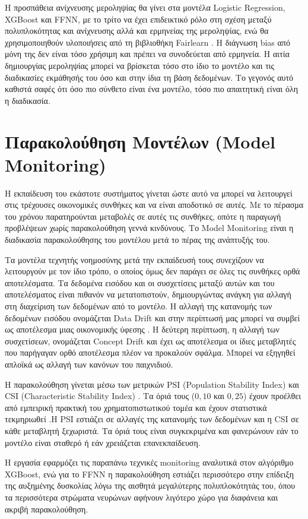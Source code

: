 Η προσπάθεια ανίχνευσης μεροληψίας θα γίνει στα μοντέλα Logistic
Regression, XGBoost και FFNN, με το τρίτο να έχει επιδεικτικό ρόλο
στη σχέση μεταξύ πολυπλοκότητας και ανίχνευσης αλλά και ερμηνείας
της μεροληψίας, ενώ θα χρησιμοποιηθούν υλοποιήσεις από τη βιβλιοθήκη
Fairlearn \citep{bird2020fairlearn}. Η διάγνωση bias από μόνη της δεν
είναι τόσο χρήσιμη και πρέπει να συνοδεύεται από ερμηνεία. Η αιτία
δημιουργίας μεροληψίας μπορεί να βρίσκεται τόσο στο ίδιο το μοντέλο
και τις διαδικασίες εκμάθησής του όσο και στην ίδια τη βάση δεδομένων.
Το γεγονός αυτό καθιστά σαφές ότι όσο πιο σύνθετο είναι ένα μοντέλο,
τόσο πιο απαιτητική είναι όλη η διαδικασία.
\section{Παρακολούθηση Μοντέλων (Model Monitoring)}
\label{sec:monitoring}

Η εκπαίδευση του εκάστοτε συστήματος γίνεται ώστε αυτό να μπορεί να
λειτουργεί στις τρέχουσες οικονομικές συνθήκες και να είναι αποδοτικό
σε αυτές. Με το πέρασμα του χρόνου παρατηρούνται μεταβολές σε αυτές
τις συνθήκες, οπότε η παραγωγή προβλέψεων χωρίς παρακολούθηση γεννά
κινδύνους. Το Model Monitoring είναι η διαδικασία παρακολούθησης του
μοντέλου μετά το πέρας της ανάπτυξής του.

Τα μοντέλα τεχνητής νοημοσύνης μετά την εκπαίδευσή τους συνεχίζουν
να λειτουργούν με τον ίδιο τρόπο, ο οποίος όμως δεν παράγει σε όλες
τις συνθήκες ορθά αποτελέσματα. Τα δεδομένα εισόδου και οι
συσχετίσεις μεταξύ αυτών και του αποτελέσματος είναι πιθανόν να
μετατοπιστούν, δημιουργώντας ανάγκη για αλλαγή στη διαχείριση των
δεδομένων από το μοντέλο. Η αλλαγή της κατανομής των δεδομένων
εισόδου ονομάζεται Data Drift και στην περίπτωσή μας μπορεί να συμβεί
ως αποτέλεσμα μιας οικονομικής ύφεσης \citep{widmer1996learning}. Η
δεύτερη περίπτωση, η αλλαγή των συσχετίσεων, ονομάζεται Concept Drift
και έχει ως αποτέλεσμα οι ίδιες μεταβλητές που παρήγαγαν ορθό
αποτέλεσμα πλέον να προκαλούν σφάλμα. Μπορεί να εξηγηθεί απλοϊκά ως
αλλαγή των κανόνων του παιχνιδιού.

Η παρακολούθηση γίνεται μέσω των μετρικών PSI (Population Stability
Index) και CSI (Characteristic Stability Index) \citep{karakoulas2004empirical, siddiqi2017intelligent, eba2023}.
Τα όριά τους ($0{,}10$ και $0{,}25$) έχουν προέλθει από εμπειρική πρακτική του 
χρηματοπιστωτικού τομέα και έχουν στατιστικά τεκμηριωθεί \citep{yurdakul2018statistical}.Η PSI
εστιάζει σε αλλαγές της κατανομής των δεδομένων και η CSI σε κάθε
μεταβλητή ξεχωριστά. Τα όριά τους είναι συγκεκριμένα και φανερώνουν
εάν το μοντέλο είναι σταθερό ή εάν χρειάζεται επανεκπαίδευση.

Η εργασία εφαρμόζει τις παραπάνω τεχνικές monitoring αναλυτικά στον
αλγόριθμο XGBoost, ενώ για το FFNN η παρακολούθηση εστιάζει
περισσότερο στην επίδειξη της αυξημένης δυσκολίας λόγω της αισθητά
μεγαλύτερης πολυπλοκότητάς του, όπου τα περισσότερα στρώματα
νευρώνων αφήνουν λιγότερο χώρο για διαφάνεια και ακριβή
παρακολούθηση.